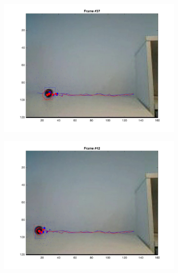 \documentclass{ethz_report}
\begin{document}
\begin{figure}[h]
\begin{subfigure}[b]{.25\textwidth}
    \end{subfigure}%
    \begin{subfigure}[b]{.25\textwidth}
        \centering
        \includegraphics[width=1\linewidth]{images/video3__36}
    \end{subfigure}
    \begin{subfigure}[b]{.25\textwidth}
        \centering
        \includegraphics[width=1\linewidth]{images/video3__41}
    \end{subfigure}%
    \begin{subfigure}[b]{.25\textwidth}
        \centering

\end{subfigure}
\end{figure}
\end{document}
